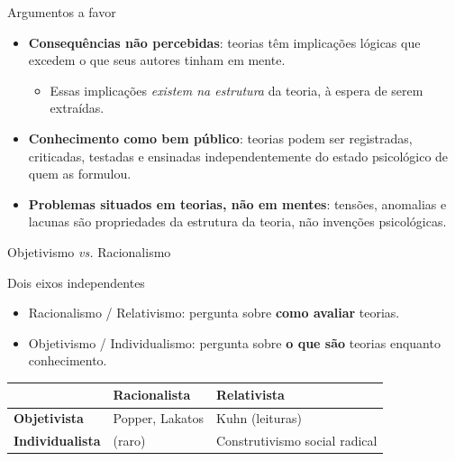 \documentclass[aspectratio=169]{beamer}
\newcommand{\impt}[1]{\textcolor{maccent}{\textbf{#1}}}
\newcommand{\ntc}[1]{\textcolor{mprimary}{#1}}
\begin{document}
\begin{frame}{Argumentos a favor}
\begin{itemize}
    \item \impt{Consequ\^encias n\~ao percebidas}: teorias t\^em implica\c c\~oes l\'ogicas que excedem o que seus autores tinham em mente.
    \begin{itemize}
        \item Essas implica\c c\~oes \emph{existem na estrutura} da teoria, \`a espera de serem extra\'idas.
    \end{itemize}
    \item \impt{Conhecimento como bem p\'ublico}: teorias podem ser registradas, criticadas, testadas e ensinadas \ntc{independentemente} do estado psicol\'ogico de quem as formulou.
    \item \impt{Problemas situados em teorias, n\~ao em mentes}: tens\~oes, anomalias e lacunas s\~ao propriedades da estrutura da teoria, n\~ao inven\c c\~oes psicol\'ogicas.
\end{itemize}
\end{frame}

\begin{frame}{Objetivismo \emph{vs.} Racionalismo}
\begin{alertblock}{Dois eixos independentes}
\begin{itemize}
    \item \ntc{Racionalismo / Relativismo}: pergunta sobre \impt{como avaliar} teorias.
    \item \ntc{Objetivismo / Individualismo}: pergunta sobre \impt{o que s\~ao} teorias enquanto conhecimento.
\end{itemize}
\end{alertblock}
\vspace{0.3cm}
\begin{center}
\small
\begin{tabularx}{\linewidth}{@{} l X X @{}}
\toprule
 & \textcolor{mprimary}{\textbf{Racionalista}} & \textcolor{maccent}{\textbf{Relativista}} \\
\midrule
\textbf{Objetivista} & Popper, Lakatos & Kuhn (leituras) \\[0.15cm]
\textbf{Individualista} & (raro) & Construtivismo social radical \\
\bottomrule
\end{tabularx}
\end{center}
\end{frame}
\end{document}
